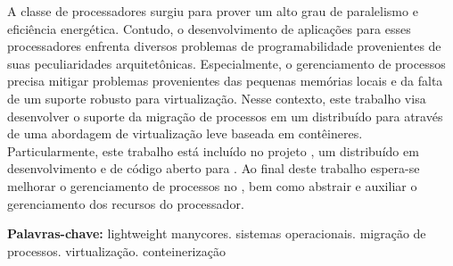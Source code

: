 \begin{resumo}[Resumo]
  A classe de processadores \lws surgiu para prover um alto grau de paralelismo e eficiência energética. Contudo, o desenvolvimento de aplicações para esses processadores enfrenta diversos problemas de programabilidade provenientes de suas peculiaridades arquitetônicas. Especialmente, o gerenciamento de processos precisa mitigar problemas provenientes das pequenas memórias locais e da falta de um suporte robusto para virtualização. Nesse contexto, este trabalho visa desenvolver o suporte da migração de processos em um \os distribuído para \lws através de uma abordagem de virtualização leve baseada em contêineres. Particularmente, este trabalho está incluído no projeto \nanvix, um \os distribuído em desenvolvimento e de código aberto para \lws. Ao final deste trabalho espera-se melhorar o gerenciamento de processos no \nanvix, bem como abstrair e auxiliar o gerenciamento dos recursos do processador.

  \vspace{\baselineskip} 
  \textbf{Palavras-chave:} lightweight manycores. sistemas operacionais. migração de processos. virtualização. conteinerização
\end{resumo}